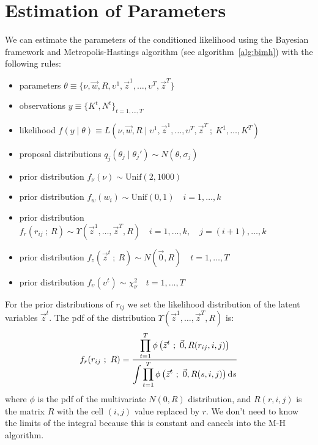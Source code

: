 \documentclass[11pt,fleqn]{book} %
\begin{document}
\section{Estimation of Parameters}

\begin{proposition}
	\label{prop:pemh}
	We can estimate the parameters of the conditioned likelihood using
	the Bayesian framework and Metropolis-Hastings algorithm 
	(see algorithm~\ref{alg:bimh}) with the following rules:
	\begin{itemize}
		\item parameters $\theta \equiv \{ \nu,\vec{w},R,\upsilon^1,\vec{z}^1,\dots,\upsilon^T,\vec{z}^T\}$
		\item observations $y \equiv \{K^t, N^t\}_{t=1,\dots,T}$
		\item likelihood $f(y \mid \theta) \equiv L(\nu,\vec{w},R  \mid  \upsilon^1,\vec{z}^1,\dots,\upsilon^T,\vec{z}^T\ ;\ K^1,\dots,K^T)$
		\item proposal distributions $q_j(\theta_j \mid \theta_j') \sim N(\theta,\sigma_j)$
		\item prior distribution $f_{\nu}(\nu) \sim \text{Unif}(2,1000)$
		\item prior distribution $f_{w}(w_i) \sim \text{Unif}(0,1) \quad i=1,\dots,k$
		\item prior distribution $f_{r}(r_{ij}\ ;\ R) \sim \Upsilon(\vec{z}^1,\dots,\vec{z}^T,R) \quad i=1,\dots,k, \quad j=(i+1),\dots,k$
		\item prior distribution $f_z(\vec{z}^t\ ;\ R) \sim N(\vec{0},R) \quad t=1,\dots,T$
		\item prior distribution $f_\upsilon(\upsilon^t) \sim \chi_{\nu}^2 \quad t=1,\dots,T$
	\end{itemize}
	For the prior distributions of $r_{ij}$ we set the likelihood distribution
	of the latent variables $\vec{z}^t$. The pdf of the distribution 
	$\Upsilon(\vec{z}^1,\dots,\vec{z}^T,R)$ is:
	\begin{displaymath}
		f_r(r_{ij}\ ;\ R) = \frac
		{\displaystyle \prod_{t=1}^{T} \phi\left( \vec{z}^t\ ;\ \vec{0}, R(r_{ij},i,j) \right)}
		{\displaystyle \int \prod_{t=1}^{T} \phi\left( \vec{z}^t\ ;\ \vec{0}, R(s,i,j) \right) \ud s}
	\end{displaymath}
	where $\phi$ is the pdf of the multivariate $N(0,R)$ distribution,
	and $R(r,i,j)$ is the matrix $R$ with the cell $(i,j)$ value 
	replaced by $r$. We don't need to know the limits of the integral
	because this is constant and cancels into the M-H algorithm.
\end{proposition}
\end{document}
